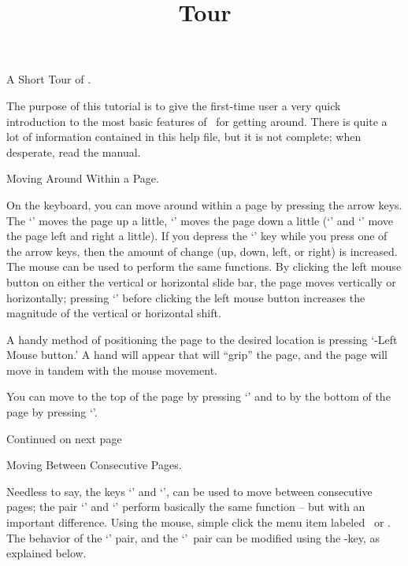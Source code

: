 \newpage

\title{Tour}A Short Tour of .

\parskip\bigskipamount

The purpose of this tutorial is to give the first-time user a very quick
introduction to the most basic features of \ for getting
around.  There is quite a lot of information contained in this help
file, but it is not complete; when desperate, read the manual.
   \bigskip

Moving Around Within a Page.

On the keyboard, you can move around within a page by pressing the arrow
keys. The `' moves the page up a little, `'
moves the page down a little (`' and `'
move the page left and right a little). If you depress the `'
key while you press one of the arrow keys, then the amount of change
(up, down, left, or right) is increased. The mouse can be used to
perform the same functions.  By clicking the left mouse button on either
the vertical or horizontal slide bar, the page moves vertically or
horizontally; pressing `' before clicking the left mouse
button increases the magnitude of the vertical or horizontal shift.

A handy method of positioning the page to the desired location is pressing
`-Left Mouse button.'
A hand will appear that will ``grip'' the page, and the page will move
in tandem with the mouse movement.

You can move to the top of the page by pressing `' and to by
the bottom of the page by pressing `'.

	\medskip

Continued on next page\ellipses

\newpage

Moving Between Consecutive Pages.

Needless to say, the keys `' and `', can be used
to move between consecutive pages; the pair `' and
`' perform basically the same function -- but with an
important difference.  Using the mouse, simple click the menu item labeled
\ or .  The behavior of the `'
pair, and the `'\ pair can be modified using the
-key, as explained below.

